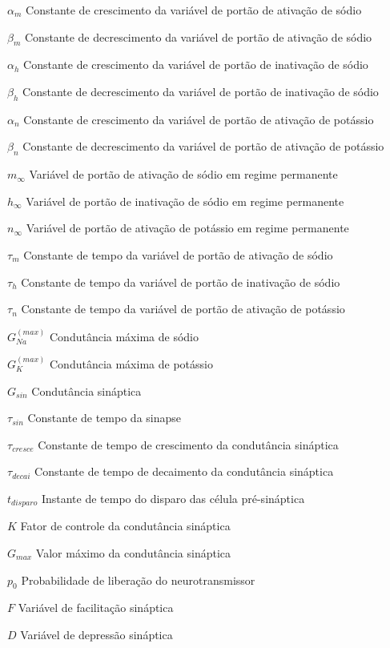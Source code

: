 \documentclass[
	12pt,				%
	openright,			%
	oneside,			%
	a4paper,			%
	chapter=TITLE,		%
	english,			%
	french,				%
	spanish,			%
	brazil				%
	]{abntex2}
\theoremstyle{definition}
\begin{document}
\begin{simbolos}
\item[$\alpha_m$] Constante de crescimento da variável de portão de ativação de sódio
\item[$\beta_m$] Constante de decrescimento da variável de portão de ativação de sódio
\item[$\alpha_h$] Constante de crescimento da variável de portão de inativação de sódio
\item[$\beta_h$] Constante de decrescimento da variável de portão de inativação de sódio
\item[$\alpha_n$] Constante de crescimento da variável de portão de ativação de potássio
\item[$\beta_n$] Constante de decrescimento da variável de portão de ativação de potássio
\item[$m_\infty$] Variável de portão de ativação de sódio em regime permanente
\item[$h_\infty$] Variável de portão de inativação de sódio em regime permanente
\item[$n_\infty$] Variável de portão de ativação de potássio em regime permanente
\item[$\tau_m$] Constante de tempo da variável de portão de ativação de sódio
\item[$\tau_h$] Constante de tempo da variável de portão de inativação de sódio
\item[$\tau_n$] Constante de tempo da variável de portão de ativação de potássio
\item[$G_{Na}^{(max)}$] Condutância máxima de sódio
\item[$G_K^{(max)}$] Condutância máxima de potássio
\item[$G_{sin}$] Condutância sináptica
\item[$\tau_{sin}$] Constante de tempo da sinapse
\item[$\tau_{cresce}$] Constante de tempo de crescimento da condutância sináptica
\item[$\tau_{decai}$] Constante de tempo de decaimento da condutância sináptica
\item[$t_{disparo}$] Instante de tempo do disparo das célula pré-sináptica
\item[$K$] Fator de controle da condutância sináptica
\item[$G_{max}$] Valor máximo da condutância sináptica
\item[$p_0$] Probabilidade de liberação do neurotransmissor
\item[$F$] Variável de facilitação sináptica
\item[$D$] Variável de depressão sináptica

\end{simbolos}
\end{document}
